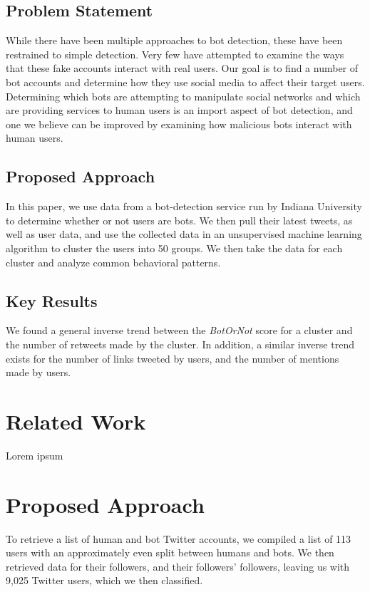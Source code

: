 \documentclass{sig-alternate-05-2015}
\begin{document}
\subsection{Problem Statement}
While there have been multiple approaches to bot detection\cite{Davis:BotOrNot}\cite{Stringhini:DetectSpam}\cite{Xiao:ClusterFakeAccounts}, these have been restrained to simple detection. Very few have attempted to examine the ways that these fake accounts interact with real users. Our goal is to find a number of bot accounts and determine how they use social media to affect their target users. Determining which bots are attempting to manipulate social networks and which are providing services to human users is an import aspect of bot detection, and one we believe can be improved by examining how malicious bots interact with human users.

\subsection{Proposed Approach}
In this paper, we use data from a bot-detection service run by Indiana University to determine whether or not users are bots. We then pull their latest tweets, as well as user data, and use the collected data in an unsupervised machine learning algorithm to cluster the users into 50 groups. We then take the data for each cluster and analyze common behavioral patterns.

\subsection{Key Results}
We found a general inverse trend between the \emph{BotOrNot} score for a cluster and the number of retweets made by the cluster. In addition, a similar inverse trend exists for the number of links tweeted by users, and the number of mentions made by users.

\section{Related Work}
Lorem ipsum

\section{Proposed Approach}
To retrieve a list of human and bot Twitter accounts, we compiled a list of 113 users with an approximately even split between humans and bots. We then retrieved data for their followers, and their followers' followers, leaving us with 9,025 Twitter users, which we then classified.
\end{document}

